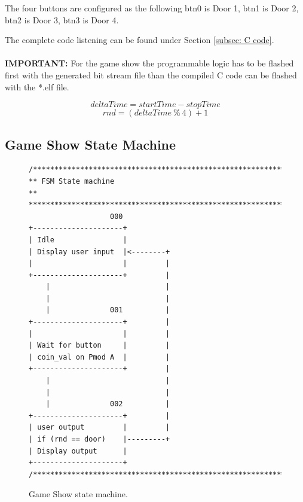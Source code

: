 The four buttons are configured as the following btn0 is Door 1, btn1 is Door 2, btn2 is Door 3, btn3 is Door 4.

The complete code listening can be found under Section \ref{subsec: C code}.
\\
\\
\textbf{IMPORTANT:} For the game show the programmable logic has to be flashed first with the generated bit stream file than the compiled C code can be flashed with the *.elf file.

\begin{equation}
deltaTime = startTime - stopTime \label{eq: delta}
\end{equation}
\begin{equation}
rnd = (deltaTime\ \%\ 4) + 1 \label{eq: random}
\end{equation}

\subsection{Game Show State Machine}\label{subsec: Game Show State Machin}
\begin{figure}[H]
	\begin{verbatim}       
/*********************************************************************************
** FSM State machine                                                            **
**********************************************************************************
                   000                        
+---------------------+           
| Idle                |           
| Display user input  |<--------+
|                     |         | 
+---------------------+         | 
    |                           |             
    |                           |             
    |              001          |             
+---------------------+         |        
|                     |         |        
| Wait for button     |         |        
| coin_val on Pmod A  |         |        
+---------------------+         |                           
    |                           |             
    |                           |             
    |              002          |             
+---------------------+         |             
| user output         |         |             
| if (rnd == door)    |---------+
| Display output      |                       
+---------------------+                            
/*********************************************************************************/
	\end{verbatim}
	\caption{Game Show state machine.}\label{fig: Game Show state machine}
\end{figure}

